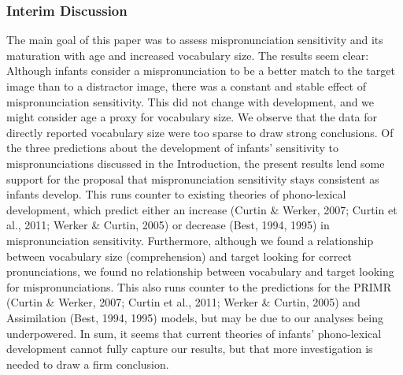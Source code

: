 \documentclass[man]{apa6}
\theoremstyle{definition}
\theoremstyle{definition}
\theoremstyle{definition}
\theoremstyle{remark}
\begin{document}
\subsubsection{Interim Discussion}\label{interim-discussion}

The main goal of this paper was to assess mispronunciation sensitivity
and its maturation with age and increased vocabulary size. The results
seem clear: Although infants consider a mispronunciation to be a better
match to the target image than to a distractor image, there was a
constant and stable effect of mispronunciation sensitivity. This did not
change with development, and we might consider age a proxy for
vocabulary size. We observe that the data for directly reported
vocabulary size were too sparse to draw strong conclusions. Of the three
predictions about the development of infants' sensitivity to
mispronunciations discussed in the Introduction, the present results
lend some support for the proposal that mispronunciation sensitivity
stays consistent as infants develop. This runs counter to existing
theories of phono-lexical development, which predict either an increase
(Curtin \& Werker, 2007; Curtin et al., 2011; Werker \& Curtin, 2005) or
decrease (Best, 1994, 1995) in mispronunciation sensitivity.
Furthermore, although we found a relationship between vocabulary size
(comprehension) and target looking for correct pronunciations, we found
no relationship between vocabulary and target looking for
mispronunciations. This also runs counter to the predictions for the
PRIMR (Curtin \& Werker, 2007; Curtin et al., 2011; Werker \& Curtin,
2005) and Assimilation (Best, 1994, 1995) models, but may be due to our
analyses being underpowered. In sum, it seems that current theories of
infants' phono-lexical development cannot fully capture our results, but
that more investigation is needed to draw a firm conclusion.
\end{document}

